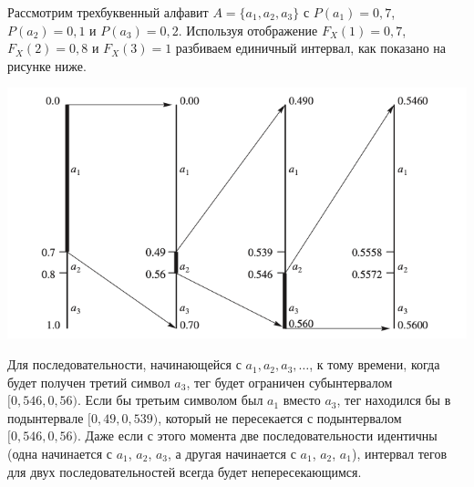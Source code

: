Рассмотрим трехбуквенный алфавит $A = \{a_1, a_2, a_3\}$ с 
$P(a_1) = 0{,}7$, $P(a_2) = 0{,}1$ и $P (a_3) = 0{,}2$.
Используя отображение $F_X (1) = 0{,}7$, $F_X (2) = 0{,}8$ и
$F_X (3) = 1$ разбиваем единичный интервал, как показано на рисунке
ниже.
\begin{center}
    \includegraphics[scale=0.5]{src/1.png}
\end{center}
Для последовательности, начинающейся с $a_1, a_2, a_3,\dots$, к тому
времени, когда будет получен третий символ $a_3$, тег будет ограничен
субынтервалом $[0,546, 0,56)$. Если бы третьим символом был $a_1$ вместо
$a_3$, тег находился бы в подынтервале $[0,49, 0,539)$, который не
пересекается с подынтервалом $[0,546, 0,56)$. Даже если с этого момента
две последовательности идентичны (одна начинается с $a_1$, $a_2$, $a_3$, а
другая начинается с $a_1$, $a_2$, $a_1$), интервал тегов для двух
последовательностей всегда будет непересекающимся.

\pagebreak